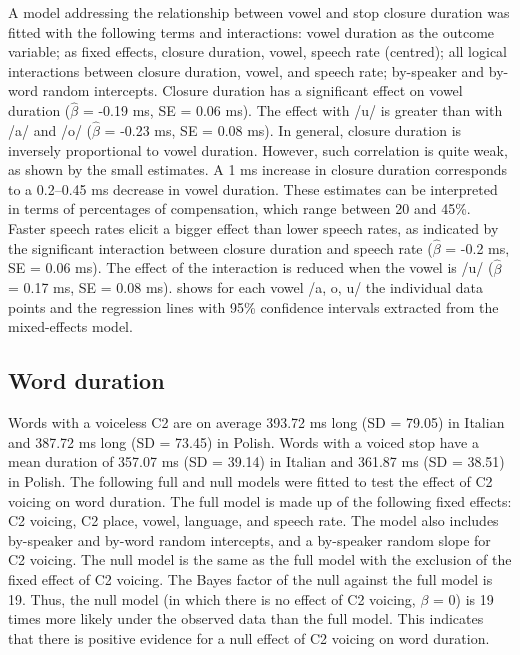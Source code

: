 \documentclass[charis]{glossa}
\begin{document}
A model addressing the relationship between vowel and stop closure
duration was fitted with the following terms and interactions: vowel
duration as the outcome variable; as fixed effects, closure duration,
vowel, speech rate (centred); all logical interactions between closure
duration, vowel, and speech rate; by-speaker and by-word random
intercepts. Closure duration has a significant effect on vowel duration
(\(\hat{\beta}\) = -0.19 ms, SE = 0.06 ms). The effect with /u/ is
greater than with /a/ and /o/ (\(\hat{\beta}\) = -0.23 ms, SE = 0.08
ms). In general, closure duration is inversely proportional to vowel
duration. However, such correlation is quite weak, as shown by the small
estimates. A 1 ms increase in closure duration corresponds to a
0.2--0.45 ms decrease in vowel duration. These estimates can be
interpreted in terms of percentages of compensation, which range between
20 and 45\%. Faster speech rates elicit a bigger effect than lower
speech rates, as indicated by the significant interaction between
closure duration and speech rate (\(\hat{\beta}\) = -0.2 ms, SE = 0.06
ms). The effect of the interaction is reduced when the vowel is /u/
(\(\hat{\beta}\) = 0.17 ms, SE = 0.08 ms).  shows for
each vowel /a, o, u/ the individual data points and the regression lines
with 95\% confidence intervals extracted from the mixed-effects model.

\hypertarget{word-duration}{%
\subsection{Word duration}\label{word-duration}}

Words with a voiceless C2 are on average 393.72 ms long (SD = 79.05) in
Italian and 387.72 ms long (SD = 73.45) in Polish. Words with a voiced
stop have a mean duration of 357.07 ms (SD = 39.14) in Italian and
361.87 ms (SD = 38.51) in Polish. The following full and null models
were fitted to test the effect of C2 voicing on word duration. The full
model is made up of the following fixed effects: C2 voicing, C2 place,
vowel, language, and speech rate. The model also includes by-speaker and
by-word random intercepts, and a by-speaker random slope for C2 voicing.
The null model is the same as the full model with the exclusion of the
fixed effect of C2 voicing. The Bayes factor of the null against the
full model is 19. Thus, the null model (in which there is no effect of
C2 voicing, \(\beta\) = 0) is 19 times more likely under the observed
data than the full model. This indicates that there is positive evidence
for a null effect of C2 voicing on word duration.
\end{document}

